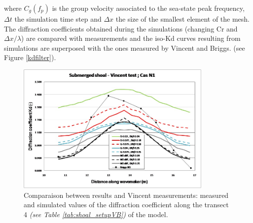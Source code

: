 where $C_g(f_p)$ is the group velocity associated to the sea-state peak
frequency, $\Delta t$ the simulation time step and $\Delta x$ the size of the
smallest element of the mesh.
The diffraction coefficients obtained during the simulations (changing Cr and
$\Delta x / \lambda $) are compared with measurements \cite{Vincent1989} and
the iso-Kd curves resulting from \tomawac simulations are superposed with the
ones measured by Vincent and Briggs. (see Figure \ref{kdfilter}).


\begin{figure}[!h]
  \centering
    \includegraphics[width=0.85\textwidth]{Kd.jpg}
    \caption{Comparaison between \tomawac results and Vincent measurements:
      measured and simulated values of the diffraction coefficient along the
      transect 4 \textit{(see Table \ref{tab:shoal_setupVB})} of the model.}
\label{kd4}
\end{figure}

